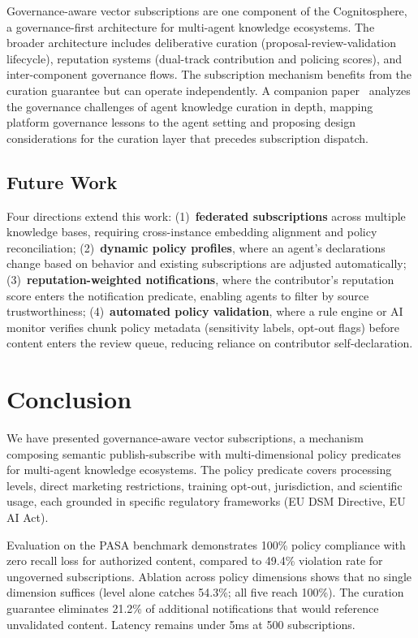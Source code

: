 \documentclass[11pt]{article}
\begin{document}
Governance-aware vector subscriptions are one component of the Cognitosphere, a governance-first architecture for multi-agent knowledge ecosystems. The broader architecture includes deliberative curation (proposal-review-validation lifecycle), reputation systems (dual-track contribution and policing scores), and inter-component governance flows. The subscription mechanism benefits from the curation guarantee but can operate independently. A companion paper~\cite{johnson2026paper2} analyzes the governance challenges of agent knowledge curation in depth, mapping platform governance lessons to the agent setting and proposing design considerations for the curation layer that precedes subscription dispatch.

\subsection{Future Work}

Four directions extend this work: (1)~\textbf{federated subscriptions} across multiple knowledge bases, requiring cross-instance embedding alignment and policy reconciliation; (2)~\textbf{dynamic policy profiles}, where an agent's declarations change based on behavior and existing subscriptions are adjusted automatically; (3)~\textbf{reputation-weighted notifications}, where the contributor's reputation score enters the notification predicate, enabling agents to filter by source trustworthiness; (4)~\textbf{automated policy validation}, where a rule engine or AI monitor verifies chunk policy metadata (sensitivity labels, opt-out flags) before content enters the review queue, reducing reliance on contributor self-declaration.

\section{Conclusion}

We have presented governance-aware vector subscriptions, a mechanism composing semantic publish-subscribe with multi-dimensional policy predicates for multi-agent knowledge ecosystems. The policy predicate covers processing levels, direct marketing restrictions, training opt-out, jurisdiction, and scientific usage, each grounded in specific regulatory frameworks (EU DSM Directive, EU AI Act).

Evaluation on the PASA benchmark demonstrates 100\% policy compliance with zero recall loss for authorized content, compared to 49.4\% violation rate for ungoverned subscriptions. Ablation across policy dimensions shows that no single dimension suffices (level alone catches 54.3\%; all five reach 100\%). The curation guarantee eliminates 21.2\% of additional notifications that would reference unvalidated content. Latency remains under 5ms at 500 subscriptions.
\end{document}
